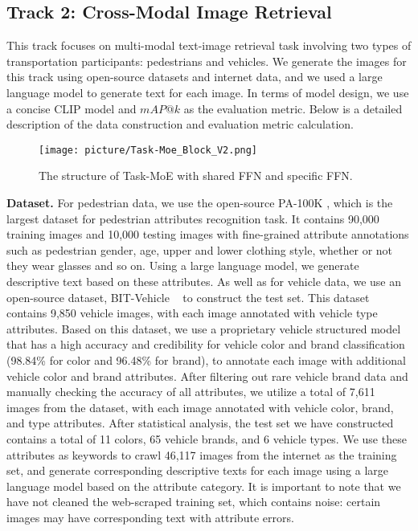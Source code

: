 \documentclass[10pt,twocolumn,letterpaper]{article}
\begin{document}
\subsection{Track 2: Cross-Modal Image Retrieval}
This track focuses on multi-modal text-image retrieval task involving two types of transportation participants: pedestrians and vehicles. We generate the images for this track using open-source datasets and internet data, and we used a large language model to generate text for each image. In terms of model design, we use a concise CLIP model and $mAP@k$ as the evaluation metric. Below is a detailed description of the data construction and evaluation metric calculation.


\begin{figure}[t]
  \centering
\texttt{[image: picture/Task-Moe\_Block\_V2.png]}
   \caption{The structure of Task-MoE with shared FFN and specific FFN.}
   \label{fig:moe}
\end{figure}


\textbf{Dataset.} 
For pedestrian data, we use the open-source PA-100K \cite{liu2017hydraplus}, which is the largest dataset for pedestrian attributes recognition task. It contains 90,000 training images and 10,000 testing images with fine-grained attribute annotations such as pedestrian gender, age, upper and lower clothing style, whether or not they wear glasses and so on. Using a large language model, we generate descriptive text based on these attributes. As well as for vehicle data, we use an open-source dataset, BIT-Vehicle ~\cite{dong2015vehicle} to construct the test set. This dataset contains 9,850 vehicle images, with each image annotated with vehicle type attributes. Based on this dataset, we use a proprietary vehicle structured model that has a high accuracy and credibility  for vehicle color and brand classification (98.84\% for color and 96.48\% for brand), to annotate each image with additional vehicle color and brand attributes. After filtering out rare vehicle brand data and manually checking the accuracy of all attributes, we utilize a total of 7,611 images from the dataset, with each image annotated with vehicle color, brand, and type attributes. After statistical analysis, the test set we have constructed contains a total of 11 colors, 65 vehicle brands, and 6 vehicle types. We use these attributes as keywords to crawl 46,117 images from the internet as the training set, and generate corresponding descriptive texts for each image using a large language model based on the attribute category. It is important to note that we have not cleaned the web-scraped training set, which contains noise: certain images may have corresponding text with attribute errors.
\end{document}
